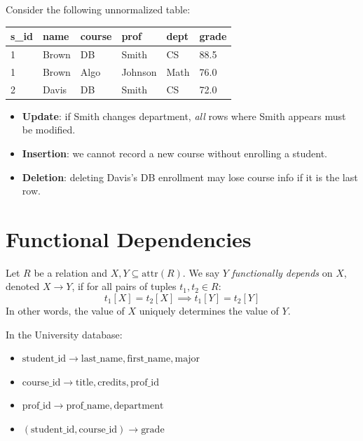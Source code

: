 \begin{example}
Consider the following unnormalized table:

\begin{center}
\begin{tabular}{llllll}
\toprule
\textbf{s\_id} & \textbf{name} & \textbf{course} & \textbf{prof} & \textbf{dept} & \textbf{grade} \\
\midrule
1 & Brown & DB & Smith & CS & 88.5 \\
1 & Brown & Algo & Johnson & Math & 76.0 \\
2 & Davis & DB & Smith & CS & 72.0 \\
\bottomrule
\end{tabular}
\end{center}

\begin{itemize}
    \item \textbf{Update}: if Smith changes department, \emph{all} rows where
          Smith appears must be modified.
    \item \textbf{Insertion}: we cannot record a new course without enrolling a student.
    \item \textbf{Deletion}: deleting Davis's DB enrollment may lose course info
          if it is the last row.
\end{itemize}
\end{example}

\section{Functional Dependencies}

\begin{definition}
Let $R$ be a relation and $X, Y \subseteq \text{attr}(R)$. We say $Y$
\emph{functionally depends} on $X$, denoted $X \to Y$, if for all pairs
of tuples $t_1, t_2 \in R$:
\[
t_1[X] = t_2[X] \implies t_1[Y] = t_2[Y]
\]
In other words, the value of $X$ uniquely determines the value of $Y$.
\end{definition}

\begin{example}
In the University database:
\begin{itemize}
    \item $\text{student\_id} \to \text{last\_name}, \text{first\_name}, \text{major}$
    \item $\text{course\_id} \to \text{title}, \text{credits}, \text{prof\_id}$
    \item $\text{prof\_id} \to \text{prof\_name}, \text{department}$
    \item $(\text{student\_id}, \text{course\_id}) \to \text{grade}$
\end{itemize}
\end{example}

